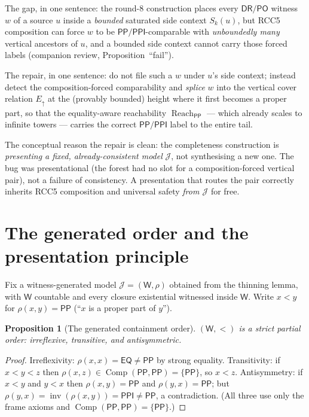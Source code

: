 \documentclass[11pt]{article}
\newtheorem{proposition}[theorem]{Proposition}
\newcommand{\EQ}{\mathsf{EQ}}
\newcommand{\DR}{\mathsf{DR}}
\newcommand{\PO}{\mathsf{PO}}
\newcommand{\PP}{\mathsf{PP}}
\newcommand{\PPI}{\mathsf{PPI}}
\newcommand{\comp}{\operatorname{Comp}}
\newcommand{\reach}{\operatorname{Reach}}
\newcommand{\Eup}{E_{\uparrow}}
\newcommand{\W}{\mathsf W}
\newcommand{\Inv}{\operatorname{inv}}
\newcommand{\J}{\mathcal J}
\begin{document}
The gap, in one sentence: the round-8 construction places every $\DR/\PO$ witness
$w$ of a source $u$ inside a \emph{bounded} saturated side context $S_k(u)$, but
RCC5 composition can force $w$ to be $\PP/\PPI$-comparable with \emph{unboundedly
many} vertical ancestors of $u$, and a bounded side context cannot carry those
forced labels (companion review, Proposition~``fail'').

The repair, in one sentence: do not file such a $w$ under $u$'s side context;
instead detect the composition-forced comparability and \emph{splice} $w$ into the
vertical cover relation $\Eup$ at the (provably bounded) height where it first
becomes a proper part, so that the equality-aware reachability $\reach_\PP$ ---
which already scales to infinite towers --- carries the correct $\PP/\PPI$ label
to the entire tail.

The conceptual reason the repair is clean: the completeness construction is
\emph{presenting a fixed, already-consistent model} $\J$, not synthesising a new
one.  The bug was presentational (the forest had no slot for a
composition-forced vertical pair), not a failure of consistency.  A presentation
that routes the pair correctly inherits RCC5 composition and universal safety
\emph{from $\J$} for free.

\section{The generated order and the presentation principle}

Fix a witness-generated model $\J=(\W,\rho)$ obtained from the thinning lemma,
with $\W$ countable and every closure existential witnessed inside $\W$.  Write
$x<y$ for $\rho(x,y)=\PP$ (``$x$ is a proper part of $y$'').

\begin{proposition}[The generated containment order]\label{prop:order}
$(\W,<)$ is a strict partial order: irreflexive, transitive, and antisymmetric.
\end{proposition}

\begin{proof}
Irreflexivity: $\rho(x,x)=\EQ\ne\PP$ by strong equality.  Transitivity: if
$x<y<z$ then $\rho(x,z)\in\comp(\PP,\PP)=\{\PP\}$, so $x<z$.  Antisymmetry: if
$x<y$ and $y<x$ then $\rho(x,y)=\PP$ and $\rho(y,x)=\PP$; but
$\rho(y,x)=\Inv(\rho(x,y))=\PPI\ne\PP$, a contradiction.  (All three use only
the frame axioms and $\comp(\PP,\PP)=\{\PP\}$.)
\end{proof}
\end{document}
